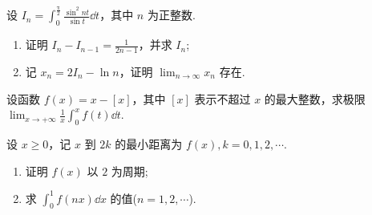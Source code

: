 	\begin{ti}
		设 $I_{n} = \int_{0}^{\frac{\uppi}{2}} \frac{\sin^{2}nt}{\sin t} \dd{t}$，其中 $n$ 为正整数.
		\begin{enumerate}
			\item 证明 $I_{n} - I_{n-1} = \frac{1}{2n-1}$，并求 $I_{n}$;
			\item 记 $x_{n} = 2I_{n} - \ln n$，证明 $\lim_{n \to \infty} x_{n}$ 存在.
		\end{enumerate}
	\end{ti}

	\begin{ti}
		设函数 $f(x) = x - [x]$，其中 $[x]$ 表示不超过 $x$ 的最大整数，求极限 $\lim_{x \to +\infty} \frac{1}{x} \int_{0}^{x} f(t) \dd{t}$.
	\end{ti}

	\begin{ti}
		设 $x \geq 0$，记 $x$ 到 $2k$ 的最小距离为 $f(x), k = 0,1,2,\cdots$.
		\begin{enumerate}
			\item 证明 $f(x)$ 以 $2$ 为周期;
			\item 求 $\int_{0}^{1} f(nx) \dd{x}$ 的值($n = 1,2,\cdots$).
		\end{enumerate}
	\end{ti}